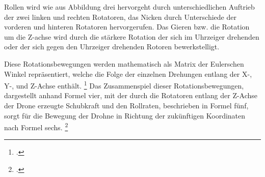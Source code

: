 Rollen wird wie aus Abbildung drei hervorgeht durch unterschiedlichen Auftrieb der zwei linken und rechten Rotatoren, das Nicken durch Unterschiede der vorderen und hinteren Rotatoren hervorgerufen.
Das Gieren bzw. die Rotation um die Z-achse wird durch die stärkere Rotation der sich im Uhrzeiger drehenden oder der sich gegen den Uhrzeiger drehenden Rotoren bewerkstelligt. 

Diese Rotationsbewegungen werden mathematisch als Matrix der Eulerschen Winkel repräsentiert, welche die Folge der einzelnen Drehungen entlang der X-, Y-, und Z-Achse enthält. \footcite[Vgl.][S. 3]{Deshpande.2020}
Das Zusammenspiel dieser Rotationsbewegungen, dargestellt anhand Formel vier, mit der durch die Rotatoren entlang der Z-Achse der Drone erzeugte Schubkraft und den Rollraten, beschrieben in Formel fünf, sorgt für die Bewegung der Drohne in Richtung der zukünftigen Koordinaten nach Formel sechs. \footcite[Vgl.][S. 2]{Deshpande.2021}


